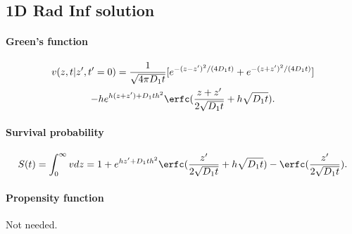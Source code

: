 \subsection{1D Rad Inf solution}

\paragraph{Green's function}
\begin{multline}
  v(z,t|z',t'=0) = \frac{1}{\sqrt{4\pi D_1 t}} [
  e^{-(z-z')^2/(4 D_1 t)} +
  e^{-(z+z')^2/(4 D_1 t)} ] \\
  -h e^{h(z+z') + D_1 th^2} \erfc(\frac{z+z'}{2\sqrt{D_1t}} + h\sqrt{D_1t}).
\end{multline}


\paragraph{Survival probability}
\begin{align}
  S(t) = \int_0^\infty v dz = 1 +  e^{h z' + D_1 t h^2}
  \erfc(\frac{z'}{2 \sqrt{D_1 t}}  + h \sqrt{D_1 t}) -
  \erfc(\frac{z'}{2 \sqrt{D_1 t}}).
\end{align}


\paragraph{Propensity function}
Not needed.
